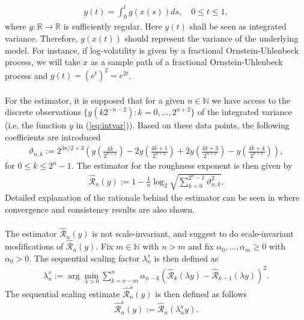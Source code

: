 \documentclass{article}
\begin{document}
\begin{align}
y(t) = \int_0^t g\left(x(s)\right) ds, \quad 0\leq t \leq 1, \label{eq:intvar}
\end{align}
where $g: \mathbb{R}\rightarrow \mathbb{R}$ is sufficiently regular. Here $y(t)$ shall be seen as integrated variance. Therefore, $g(x(t))$ should represent the variance of the underlying model. For instance, if log-volatility is given by a fractional Ornstein-Uhlenbeck process, we will take $x$  as a sample path of a fractional Ornstein-Uhlenbeck process and $g(t)=(e^t)^2 = e^{2t}$.\\\\
For the estimator, it is supposed that for a given $n\in \mathbb{N}$ we have access to the discrete observations $\{y(k2^{-n-2}):k=0,...,2^{n+2}\}$ of the integrated variance (i.e. the function $y$ in (\ref{eq:intvar})). Based on these data points, the following coefficients are introduced
\begin{align}
\vartheta_{n,k} := 2^{3n/2+3} \left( 
y\left( \frac{4k}{2^{n+2}} \right) 
- 2y\left( \frac{4k+1}{2^{n+2}} \right) 
+ 2y\left( \frac{4k+3}{2^{n+2}} \right) 
- y\left( \frac{4k+4}{2^{n+2}} \right) 
\right),
\end{align}
for $0\leq k \leq 2^n - 1$. The estimator for the roughness exponent is then given by
\begin{align*}
\hat{\mathscr{R}}_n (y) := 1 - \frac{1}{n}\log_2 \sqrt{\sum_{k=0}^{2^n-1}\vartheta_{n,k}^2}.
\end{align*}
Detailed explanation of the rationale behind the estimator can be seen in \cite{han} where convergence and consistency results are also shown.\\\\
The estimator $\hat{\mathscr{R}}_n (y)$ is not scale-invariant, and \cite{han} suggest to do scale-invariant modifications of $\hat{\mathscr{R}}_n (y)$. Fix $m\in \mathbb{N}$ with $n>m$ and fix $\alpha_0, ..., \alpha_m \geq 0$ with $\alpha_0>0$. The sequential scaling factor $\lambda_n^s$ is then defined as
\begin{align}
\lambda_n^s := \arg\min_{\lambda>0} \sum_{k=n-m}^n \alpha_{n-k} \left( \hat{\mathscr{R}}_k (\lambda y)-\hat{\mathscr{R}}_{k-1} (\lambda y)\right)^2 . \label{eq:scale_lambda}
\end{align}
The sequential scaling estimate $\hat{\mathscr{R}}_n^s (y)$ is then defined as follows 
\begin{align*}
\hat{\mathscr{R}}_n^s (y) := \hat{\mathscr{R}}_n (\lambda_n^s y).
\end{align*}
\end{document}
